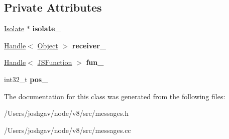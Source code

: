 \subsection*{Private Attributes}
\begin{DoxyCompactItemize}
\item 
\hyperlink{classv8_1_1internal_1_1_isolate}{Isolate} $\ast$ {\bfseries isolate\+\_\+}\hypertarget{classv8_1_1internal_1_1_call_site_a17609db2d19d3c21a084e116041027d7}{}\label{classv8_1_1internal_1_1_call_site_a17609db2d19d3c21a084e116041027d7}

\item 
\hyperlink{classv8_1_1internal_1_1_handle}{Handle}$<$ \hyperlink{classv8_1_1internal_1_1_object}{Object} $>$ {\bfseries receiver\+\_\+}\hypertarget{classv8_1_1internal_1_1_call_site_aad24f8ece48a2e804306eb53159f0ead}{}\label{classv8_1_1internal_1_1_call_site_aad24f8ece48a2e804306eb53159f0ead}

\item 
\hyperlink{classv8_1_1internal_1_1_handle}{Handle}$<$ \hyperlink{classv8_1_1internal_1_1_j_s_function}{J\+S\+Function} $>$ {\bfseries fun\+\_\+}\hypertarget{classv8_1_1internal_1_1_call_site_a3bb96b3a9cf28e548b34b5ad3327e76f}{}\label{classv8_1_1internal_1_1_call_site_a3bb96b3a9cf28e548b34b5ad3327e76f}

\item 
int32\+\_\+t {\bfseries pos\+\_\+}\hypertarget{classv8_1_1internal_1_1_call_site_a20a1ada52243cac8f624a6a8fe4670b1}{}\label{classv8_1_1internal_1_1_call_site_a20a1ada52243cac8f624a6a8fe4670b1}

\end{DoxyCompactItemize}


The documentation for this class was generated from the following files\+:\begin{DoxyCompactItemize}
\item 
/\+Users/joshgav/node/v8/src/messages.\+h\item 
/\+Users/joshgav/node/v8/src/messages.\+cc\end{DoxyCompactItemize}
